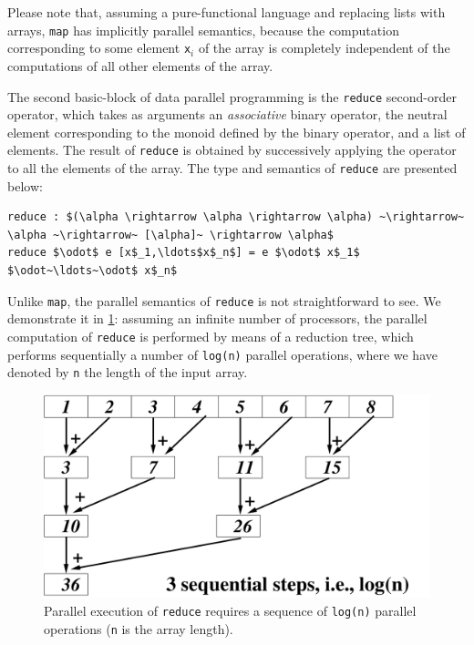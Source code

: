 \documentclass[acmsmall,review]{acmart}\settopmatter{printfolios=true,printccs=false,printacmref=false}
\begin{document}
Please note that, assuming a pure-functional language and replacing
lists with arrays, \lstinline{map} has implicitly parallel semantics, 
because the computation corresponding to some element {\tt x$_i$}
of the array is completely independent of the computations of all
other elements of the array.


The second basic-block of data parallel programming is the
\lstinline{reduce} second-order operator, which takes as arguments
an \emph{associative} binary operator, the neutral element corresponding
to the monoid defined by the binary operator, and a list of elements.
The result of \lstinline{reduce} is obtained by successively applying 
the operator to all the elements of the array. The type and semantics of 
\lstinline{reduce} are presented below:
\begin{lstlisting}[mathescape=true]
reduce : $(\alpha \rightarrow \alpha \rightarrow \alpha) ~\rightarrow~ \alpha ~\rightarrow~ [\alpha]~ \rightarrow \alpha$
reduce $\odot$ e [x$_1,\ldots$x$_n$] = e $\odot$ x$_1$ $\odot~\ldots~\odot$ x$_n$
\end{lstlisting}\vspace{-2ex}

Unlike \lstinline{map}, the parallel semantics of \lstinline{reduce}
is not straightforward to see. We demonstrate it in 
\cref{fig:reduction-tree}: assuming an infinite number of
processors, the parallel computation of \lstinline{reduce} is 
performed by means of a reduction tree, which performs sequentially
a number of {\tt log(n)} parallel operations, where we have denoted
by {\tt n} the length of the input array. 


\begin{figure}
\includegraphics[width=70ex]{Figures/L1/ReduceEg.pdf}
\caption{Parallel execution of \lstinline{reduce} requires
        a sequence of \lstinline{log(n)} parallel operations
        ({\tt n} is the array length).}
\label{fig:reduction-tree}
\end{figure} 
\end{document}

